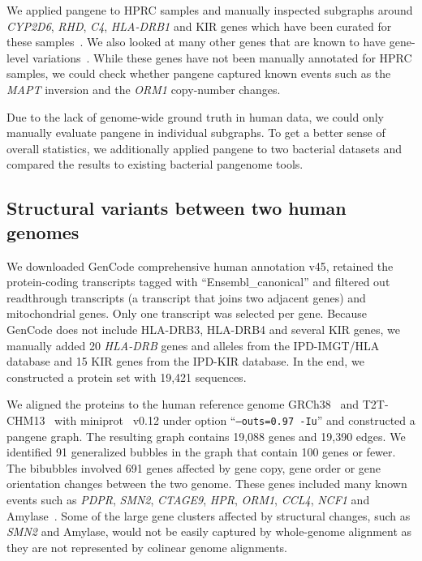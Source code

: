 \documentclass[webpdf,contemporary,large,namedate]{oup-authoring-template}%
\begin{document}
We applied pangene to HPRC samples and manually inspected subgraphs around \emph{CYP2D6}, \emph{RHD}, \emph{C4}, \emph{HLA-DRB1} and KIR genes
which have been curated for these samples~\citep{Liao:2023aa,Zhou2024.01.20.576452}.
We also looked at many other genes that are known to have gene-level variations~\citep{Sudmant:2010aa,Boettger:2012aa,Handsaker:2015ur}.
While these genes have not been manually annotated for HPRC samples,
we could check whether pangene captured known events such as
the \emph{MAPT} inversion and the \emph{ORM1} copy-number changes.

Due to the lack of genome-wide ground truth in human data,
we could only manually evaluate pangene in individual subgraphs.
To get a better sense of overall statistics,
we additionally applied pangene to two bacterial datasets
and compared the results to existing bacterial pangenome tools.

\subsection{Structural variants between two human genomes}

We downloaded GenCode comprehensive human annotation v45,
retained the protein-coding transcripts tagged with ``Ensembl\_canonical'' and filtered out readthrough transcripts (a transcript that joins two adjacent genes) and mitochondrial genes.
Only one transcript was selected per gene.
Because GenCode does not include HLA-DRB3, HLA-DRB4 and several KIR genes,
we manually added 20 {\it HLA-DRB} genes and alleles from the IPD-IMGT/HLA database and
15 KIR genes from the IPD-KIR database.
In the end, we constructed a protein set with 19,421 sequences.

We aligned the proteins to the human reference genome GRCh38~\citep{Schneider:2017aa} and T2T-CHM13~\citep{Nurk:2022up}
with miniprot~\citep{Li:2023ac} v0.12 under option ``{\tt --outs=0.97 -Iu}''
and constructed a pangene graph.
The resulting graph contains 19,088 genes and 19,390 edges.
We identified 91 generalized bubbles in the graph that contain 100 genes or fewer.
The bibubbles involved 691 genes affected by gene copy, gene order or gene orientation changes between the two genome.
These genes included many known events such as {\it PDPR}, {\it SMN2}, {\it CTAGE9}, {\it HPR}, {\it ORM1}, {\it CCL4}, {\it NCF1} and Amylase~\citep{Handsaker:2015ur,Sudmant:2010aa}.
Some of the large gene clusters affected by structural changes, such as {\it SMN2} and Amylase,
would not be easily captured by whole-genome alignment as they are not represented by colinear genome alignments.
\end{document}
